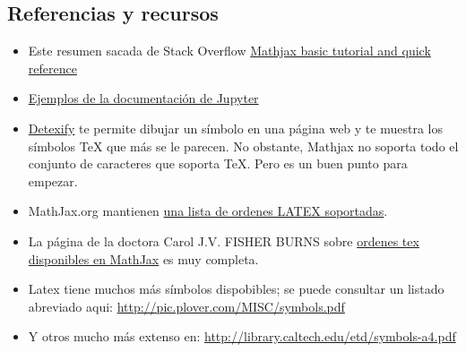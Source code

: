 \documentclass[11pt]{article}
\begin{document}
    
    \subsection{Referencias y recursos}\label{referencias-y-recursos}

\begin{itemize}
\item
  Este resumen sacada de Stack Overflow
  \href{https://math.meta.stackexchange.com/questionsa/5020/mathjax-basic-tutorial-and-quick-reference}{Mathjax
  basic tutorial and quick reference}
\item
  \href{http://jupyter-notebook.readthedocs.io/en/stable/examples/Notebook/Typesetting\%20Equations.html}{Ejemplos
  de la documentación de Jupyter}
\item
  \href{http://detexify.kirelabs.org/classify.html}{Detexify} te permite
  dibujar un símbolo en una página web y te muestra los símbolos TeX que
  más se le parecen. No obstante, Mathjax no soporta todo el conjunto de
  caracteres que soporta TeX. Pero es un buen punto para empezar.
\item
  MathJax.org mantienen
  \href{http://docs.mathjax.org/en/latest/tex.html\#supported-latex-commands}{una
  lista de ordenes LATEX soportadas}.
\item
  La página de la doctora Carol J.V. FISHER BURNS sobre
  \href{http://www.onemathematicalcat.org/MathJaxDocumentation/TeXSyntax.htm}{ordenes
  tex disponibles en MathJax} es muy completa.
\item
  Latex tiene muchos más símbolos dispobibles; se puede consultar un
  listado abreviado aqui: \url{http://pic.plover.com/MISC/symbols.pdf}
\item
  Y otros mucho más extenso en:
  \url{http://library.caltech.edu/etd/symbols-a4.pdf}
\end{itemize}


    
    
    
    
\end{document}
